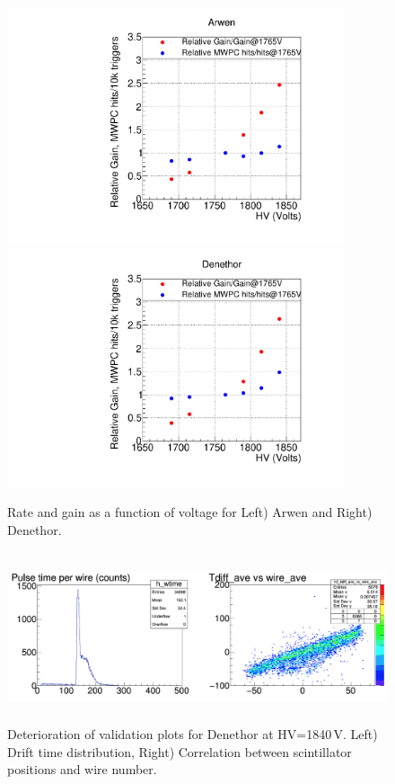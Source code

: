 \documentclass[12pt]{article}
\begin{document}
\begin{figure}[tbph]
\begin{center}
\includegraphics[height=7cm,clip=true]{plot_Arwen_HVscan}
\includegraphics[height=7cm,clip=true]{plot_Denethor_HVscan}   
\caption{Rate and gain as a function of voltage for Left) Arwen and Right) Denethor.
\label{fig:plot_HVscan}}
\end{center}
\end{figure} 


\begin{figure}[tbph]
\begin{center}
\includegraphics[height=5cm,clip=true]{Denethor_R183_HV1840_Th200}
\caption{Deterioration of validation plots for Denethor at HV=1840\,V. Left) Drift time distribution, Right) Correlation between scintillator positions and wire number.
\label{fig:Denethor_R183_HV1840_Th200}}
\end{center}
\end{figure} 
\end{document}

